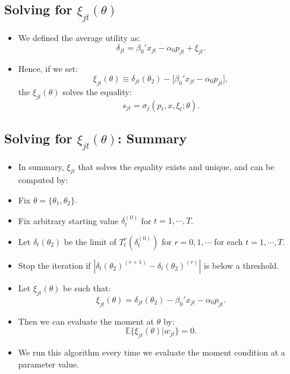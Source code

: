 \documentclass[
]{book}
\providecommand{\tightlist}{%
  \setlength{\itemsep}{0pt}\setlength{\parskip}{0pt}}
\begin{document}
\hypertarget{solving-for-xi_jttheta}{%
\subsection{\texorpdfstring{Solving for \(\xi_{jt}(\theta)\)}{Solving for \textbackslash xi\_\{jt\}(\textbackslash theta)}}\label{solving-for-xi_jttheta}}

\begin{itemize}
\tightlist
\item
  We defined the average utility as:
  \begin{equation}
  \delta_{jt} =  \beta_0' x_{jt} - \alpha_0 p_{jt} + \xi_{jt}.
  \end{equation}
\item
  Hence, if we set:
  \begin{equation}
  \xi_{jt}(\theta) \equiv \delta_{jt}(\theta_2) - \Bigg[\beta_0' x_{jt} - \alpha_0 p_{jt} \Bigg],
  \end{equation}
  the \(\xi_{jt}(\theta)\) solves the equality:
  \begin{equation}
  s_{jt} = \sigma_{j}(p_t, x, \xi_t; \theta).
  \end{equation}
\end{itemize}

\hypertarget{solving-for-xi_jttheta-summary}{%
\subsection{\texorpdfstring{Solving for \(\xi_{jt}(\theta)\): Summary}{Solving for \textbackslash xi\_\{jt\}(\textbackslash theta): Summary}}\label{solving-for-xi_jttheta-summary}}

\begin{itemize}
\tightlist
\item
  In summary, \(\xi_{jt}\) that solves the equality exists and unique, and can be computed by:
\item
  Fix \(\theta = \{\theta_1, \theta_2\}\).
\item
  Fix arbitrary starting value \(\delta_t^{(0)}\) for \(t = 1, \cdots, T\).
\item
  Let \(\delta_t(\theta_2)\) be the limit of \(T_t^r(\delta_t^{(0)})\) for \(r = 0, 1, \cdots\) for each \(t = 1, \cdots, T\).
\item
  Stop the iteration if \(|\delta_t(\theta_2)^{(r + 1)} - \delta_t(\theta_2)^{(r)}|\) is below a threshold.
\item
  Let \(\xi_{jt}(\theta)\) be such that:
  \begin{equation}
  \xi_{jt}(\theta) = \delta_{jt}(\theta_2) - \beta_0' x_{jt} - \alpha_0 p_{jt}.
  \end{equation}
\item
  Then we can evaluate the moment at \(\theta\) by:
  \begin{equation}
  \mathbb{E}\{\xi_{jt}(\theta)|w_{jt}\} = 0.
  \end{equation}
\item
  We run this algorithm every time we evaluate the moment condition at a parameter value.
\end{itemize}
\end{document}
